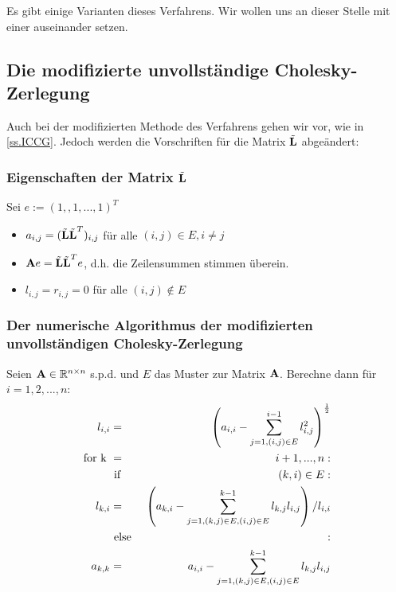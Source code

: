 Es gibt einige Varianten dieses Verfahrens. Wir wollen uns an dieser Stelle mit einer auseinander setzen.

\subsection{Die modifizierte unvollständige Cholesky-Zerlegung}

Auch bei der modifizierten Methode des Verfahrens gehen wir vor, wie in \autoref{ss.ICCG}. Jedoch werden die Vorschriften für die Matrix $\tilde{{\textbf{L}}}$ abgeändert:

\subsubsection{Eigenschaften der Matrix $\tilde{{\textbf{L}}}$}

Sei $e := (1,,1,...,1)^{T}$

\begin{itemize}
\item $a_{i,j} = (\tilde{{\textbf{L}}} \tilde{{\textbf{L}}}^{T})_{i,j}$ für alle $(i,j) \in E, i \ne j$
\item ${\textbf{A}} e = \tilde{{\textbf{L}}} \tilde{{\textbf{L}}}^{T} e$, d.h. die Zeilensummen stimmen überein.
\item $l_{i,j} = r_{i,j} = 0$ für alle $(i,j) \notin E$
\end{itemize}

\subsubsection{Der numerische Algorithmus der modifizierten unvollständigen Cholesky-Zerlegung}

Seien ${\textbf{A}} \in \mathbb{R}^{n \times n}$ s.p.d. und $E$ das Muster zur Matrix ${\textbf{A}}$. Berechne dann für $i=1,2,...,n$:
\begin{eqnarray}
l_{i,i} &=& \left( a_{i,i} - \sum^{i-1}_{j=1,(i,j) \in E} l_{i,j}^{2} \right)^{\frac {1} {2}} \\
\textnormal{for k } &=& i+1,...,n: \\
&\textnormal{ if }& (k,i) \in E: \\
l_{k,i} &=& \left( a_{k,i} - \sum^{k-1}_{j=1,(k,j) \in E, (i,j) \in E} l_{k,j} l_{i,j} \right) / l_{i,i} \\
&\textnormal{ else }&:\\
a_{k,k} &=& a_{i,i} - \sum^{k-1}_{j=1,(k,j) \in E, (i,j) \in E} l_{k,j} l_{i,j}
\end{eqnarray}

